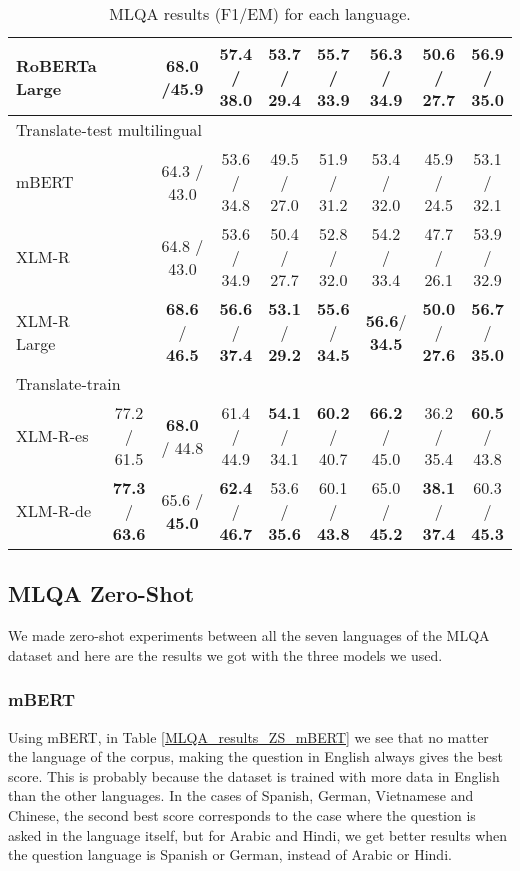 \documentclass[11pt]{article}
\begin{document}
\begin{table*}[!ht]
\begin{adjustbox}{max width=\textwidth}
\begin{tabular}{l|ccccccc|c}
        RoBERTa Large & ~ &\textbf{68.0} /\textbf{45.9} & \textbf{57.4} / \textbf{38.0} & \textbf{53.7} / \textbf{29.4} & \textbf{55.7} / \textbf{33.9} & 56.3 / \textbf{34.9} & \textbf{50.6} / 27.7 & \textbf{56.9} / \textbf{35.0}\\
        \midrule
        \multicolumn{9}{l}{Translate-test multilingual} \\
        \midrule
        mBERT & ~ & 64.3 / 43.0 & 53.6 / 34.8 & 49.5 / 27.0 & 51.9 / 31.2 & 53.4 / 32.0 & 45.9 / 24.5 & 53.1 / 32.1 \\
        XLM-R & ~ &64.8 / 43.0 & 53.6 / 34.9 & 50.4 / 27.7 & 52.8 / 32.0 & 54.2 / 33.4 & 47.7 / 26.1 & 53.9 / 32.9 \\
        XLM-R Large & ~ & \textbf{68.6} / \textbf{46.5} & \textbf{56.6} / \textbf{37.4} & \textbf{53.1} / \textbf{29.2} & \textbf{55.6} / \textbf{34.5} & \textbf{56.6}/ \textbf{34.5} & \textbf{50.0} / \textbf{27.6} & \textbf{56.7} / \textbf{35.0} \\
        \midrule
        \multicolumn{9}{l}{Translate-train} \\
        \midrule
        XLM-R-es &77.2 / 61.5 & \textbf{68.0} / 44.8 & 61.4 / 44.9 & \textbf{54.1} / 34.1 & \textbf{60.2} / 40.7 & \textbf{66.2} / 45.0 & 36.2 / 35.4 & \textbf{60.5} / 43.8 \\
        XLM-R-de & \textbf{77.3} / \textbf{63.6} & 65.6 / \textbf{45.0} & \textbf{62.4} / \textbf{46.7} & 53.6 / \textbf{35.6} & 60.1 / \textbf{43.8} & 65.0 / \textbf{45.2} & \textbf{38.1} / \textbf{37.4} & 60.3 / \textbf{45.3}\\
        \bottomrule
    \end{tabular}
    \end{adjustbox}
    \centering
    \caption{MLQA results (F1/EM) for each language.}
    \label{MLQA_results}
\end{table*}

\subsection{MLQA Zero-Shot}

We made zero-shot experiments between all the seven languages of the MLQA dataset and here are the results we got with the three models we used.

\subsubsection{mBERT}

Using mBERT, in Table \ref{MLQA_results_ZS_mBERT} we see that no matter the language of the corpus, making the question in English always gives the best score. This is probably because the dataset is trained with more data in English than the other languages. In the cases of Spanish, German, Vietnamese and Chinese, the second best score corresponds to the case where the question is asked in the language itself, but for Arabic and Hindi, we get better results when the question language is Spanish or German, instead of Arabic or Hindi.
\end{document}
